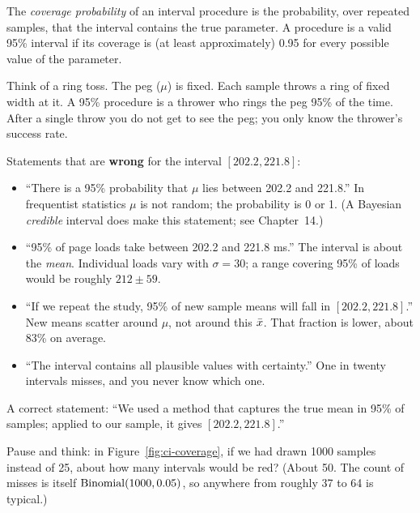 \begin{definition}[Coverage]
The \emph{coverage probability} of an interval procedure is the probability,
over repeated samples, that the interval contains the true parameter. A
procedure is a valid 95\% interval if its coverage is (at least
approximately) 0.95 for every possible value of the parameter.
\end{definition}

\begin{intuitionbox}
Think of a ring toss. The peg ($\mu$) is fixed. Each sample throws a ring of
fixed width at it. A 95\% procedure is a thrower who rings the peg 95\% of the
time. After a single throw you do not get to see the peg; you only know the
thrower's success rate.
\end{intuitionbox}

\begin{trapbox}
Statements that are \textbf{wrong} for the interval $[202.2, 221.8]$:
\begin{itemize}
  \item ``There is a 95\% probability that $\mu$ lies between 202.2 and
        221.8.'' In frequentist statistics $\mu$ is not random; the probability is 0 or 1.
        (A Bayesian \emph{credible} interval does make this statement; see Chapter~14.)
  \item ``95\% of page loads take between 202.2 and 221.8 ms.'' The interval is
        about the \emph{mean}. Individual loads vary with $\sigma=30$; a range
        covering 95\% of loads would be roughly $212\pm 59$.
  \item ``If we repeat the study, 95\% of new sample means will fall in
        $[202.2,221.8]$.'' New means scatter around $\mu$, not around this
        $\bar{x}$. That fraction is lower, about 83\% on average.
  \item ``The interval contains all plausible values with certainty.'' One
        in twenty intervals misses, and you never know which one.
\end{itemize}
A correct statement: ``We used a method that captures the true mean in 95\%
of samples; applied to our sample, it gives $[202.2, 221.8]$.''
\end{trapbox}

\begin{recoverybox}
Pause and think: in Figure~\ref{fig:ci-coverage}, if we had drawn 1000
samples instead of 25, about how many intervals would be red? (About 50. The
count of misses is itself $\operatorname{Binomial}(1000, 0.05)$, so anywhere from roughly
37 to 64 is typical.)
\end{recoverybox}

